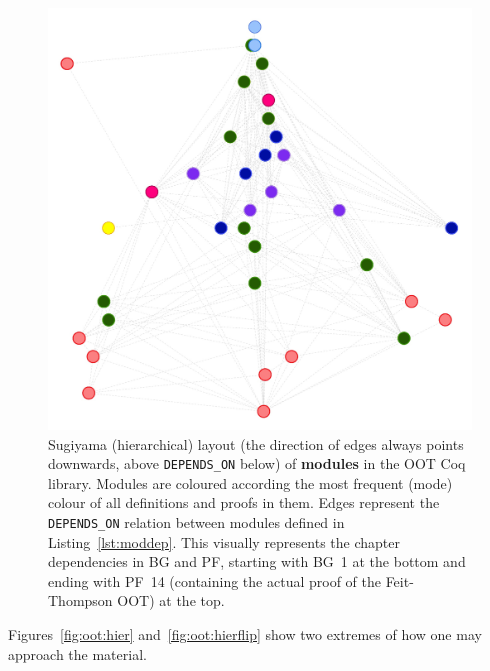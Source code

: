 \begin{figure}[tp]
\centering
\includegraphics[height=0.35\textheight]{img/oot/module_hierarchical}
\caption{Sugiyama (hierarchical) layout (the direction of edges always
  points downwards, above \texttt{DEPENDS\_ON} below) of \textbf{modules} in the
  OOT Coq library. Modules are coloured according the most frequent (mode)
  colour of all definitions and proofs in them. Edges represent the
  \texttt{DEPENDS\_ON} relation between modules defined in
  Listing~\ref{lst:moddep}. This visually represents the chapter dependencies in
  BG and PF, starting with BG~1 at the bottom and ending with PF~14 (containing
  the actual proof of the Feit-Thompson OOT) at the top.}\label{fig:oot:modhier}
\end{figure}

Figures~\ref{fig:oot:hier} and~\ref{fig:oot:hierflip} show two extremes of how
one may approach the material. 

